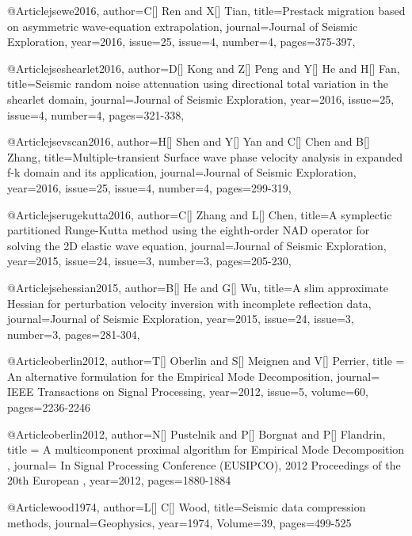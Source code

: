 @Article{jsewe2016,
  author={C[] Ren and X[] Tian},
  title={Prestack migration based on asymmetric wave-equation extrapolation},
  journal={Journal of Seismic Exploration},
  year=2016,
  issue=25,
  issue=4,
  number=4,
  pages={375-397},
}

@Article{jseshearlet2016,
  author={D[] Kong and Z[] Peng and Y[] He and H[] Fan},
  title={Seismic random noise attenuation using directional total variation in the shearlet domain},
  journal={Journal of Seismic Exploration},
  year=2016,
  issue=25,
  issue=4,
  number=4,
  pages={321-338},
}

@Article{jsevscan2016,
  author={H[] Shen and Y[] Yan and C[] Chen and B[] Zhang},
  title={Multiple-transient Surface wave phase velocity analysis in expanded f-k domain and its application},
  journal={Journal of Seismic Exploration},
  year=2016,
  issue=25,
  issue=4,
  number=4,
  pages={299-319},
}

@Article{jserugekutta2016,
  author={C[] Zhang and L[] Chen},
  title={A symplectic partitioned Runge-Kutta method using the eighth-order NAD operator for solving the 2D elastic wave equation},
  journal={Journal of Seismic Exploration},
  year=2015,
  issue=24,
  issue=3,
  number=3,
  pages={205-230},
}


@Article{jsehessian2015,
  author={B[] He and G[] Wu},
  title={A slim approximate Hessian for perturbation velocity inversion with incomplete reflection data},
  journal={Journal of Seismic Exploration},
  year=2015,
  issue=24,
  issue=3,
  number=3,
  pages={281-304},
}








@Article{oberlin2012,
  author={T[] Oberlin and S[] Meignen and V[] Perrier},
  title = { An alternative formulation for the Empirical Mode Decomposition},
  journal={ IEEE Transactions on Signal Processing},
  year=2012,
  issue=5,
  volume=60,
  pages=2236-2246}

@Article{oberlin2012,
  author={N[] Pustelnik and P[] Borgnat and P[] Flandrin},
  title = { A multicomponent proximal algorithm for Empirical Mode Decomposition },
  journal={  In Signal Processing Conference (EUSIPCO), 2012 Proceedings of the 20th European },
  year=2012,
  pages=1880-1884}
  
@Article{wood1974,
  author={L[] C[] Wood},
  title={Seismic data compression methods},
  journal={Geophysics},
  year=1974,
  Volume=39,
  pages={499-525}
}

